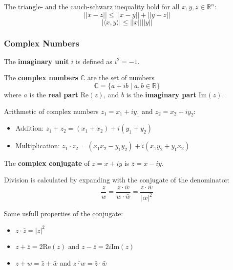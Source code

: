 \begin{theorem}
    The triangle- and the cauch-schwarz inequality hold for all $x, y, z \in \mathbb{R}^n$:
    $$||x - z|| \leq ||x - y|| + ||y - z||$$
    $$|\langle x, y \rangle| \leq ||x|| ||y||$$
\end{theorem}

\subsubsection{Complex Numbers}

\begin{definition}
    The \textbf{imaginary unit} $i$ is defined as $i^2 = -1$.
\end{definition}

\begin{definition}
    The \textbf{complex numbers} $\mathbb{C}$ are the set of numbers
    $$\mathbb{C} = \{a + ib \mid a, b \in \mathbb{R}\}$$
    where $a$ is the \textbf{real part} $\text{Re}(z)$, and $b$ is the \textbf{imaginary part} $\text{Im}(z)$.
\end{definition}

\begin{definition}
    Arithmetic of complex numbers $z_1 = x_1 + i y_1$ and $z_2 = x_2 + i y_2$:
    \begin{itemize}
        \item Addition: $z_1 + z_2 = (x_1 + x_2) + i(y_1 + y_2)$
        \item Multiplication: $z_1 \cdot z_2 = (x_1 x_2 - y_1 y_2) + i(x_1 y_2 + y_1 x_2)$
    \end{itemize}
\end{definition}

\begin{definition}
    The \textbf{complex conjugate} of $z = x + iy$ is $\bar{z} = x - iy$.
\end{definition}

\begin{important}
    Division is calculated by expanding with the conjugate of the denominator:
    $$\frac{z}{w} = \frac{z \cdot \bar{w}}{w \cdot \bar{w}} = \frac{z \cdot \bar{w}}{|w|^2}$$
\end{important}

\begin{remark}
    Some usfull properties of the conjugate:
    \begin{itemize}
        \item $z \cdot \bar{z} = |z|^2$
        \item $z + \bar{z} = 2\text{Re}(z)$ and $z - \bar{z} = 2i\text{Im}(z)$
        \item $\overline{z+w} = \bar{z} + \bar{w}$ and $\overline{z \cdot w} = \bar{z} \cdot \bar{w}$
    \end{itemize}
\end{remark}

